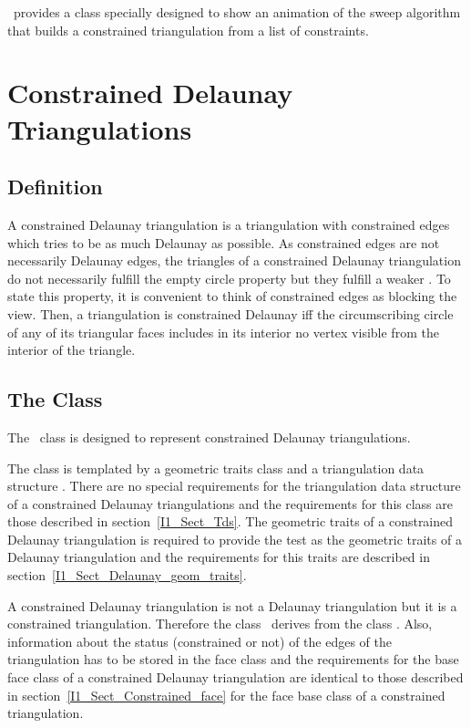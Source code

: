 \cgal\ provides 
a class  
specially designed to show an animation of the sweep algorithm 
that builds a 
constrained triangulation from a list of constraints.



\section{Constrained Delaunay Triangulations}
\label{I1_Sect_Constrained_Delaunay_Triangulations}

\subsection{Definition}
A constrained Delaunay triangulation is a triangulation with
constrained edges which tries to be as much Delaunay as possible.
As constrained edges are not necessarily Delaunay edges,
the triangles of a constrained Delaunay triangulation do not
necessarily fulfill the empty circle property
but they fulfill a weaker .
 To state this property,
it is convenient to think of  constrained
edges as blocking the view. Then, a triangulation is 
constrained Delaunay iff
 the circumscribing circle
of any of its triangular faces includes in its interior 
no vertex  visible
from the interior of the triangle.

\subsection{The Class 
\protect {}}

The \cgal\ class
is designed to represent
constrained Delaunay triangulations.

The class is templated by a geometric traits class 
and a triangulation data structure .
There are no special requirements for the triangulation data
structure
of a constrained Delaunay triangulations and the requirements
for this class are those described
in section~\ref{I1_Sect_Tds}. The geometric traits 
of a constrained Delaunay triangulation is required
to provide the  test as the geometric traits
of a Delaunay triangulation and the requirements for this traits
are described in section~\ref{I1_Sect_Delaunay_geom_traits}. 

A constrained Delaunay triangulation is not a Delaunay
triangulation but it is a constrained triangulation.
Therefore the class \ccClassTemplateName\ derives from
the class .
Also, information about the status (constrained or not)
of the edges of the triangulation has to be stored
in the face class
 and the requirements for the base face class
of a constrained Delaunay triangulation are 
identical to those described in 
section~\ref{I1_Sect_Constrained_face} for the face base class
of a constrained  triangulation.

